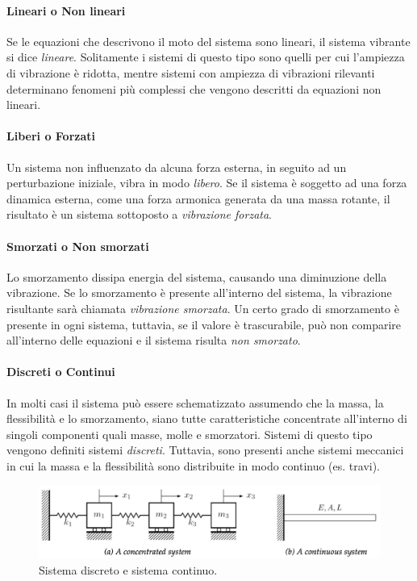 \paragraph{Lineari o Non lineari} Se le equazioni che descrivono il moto del sistema sono lineari, il sistema vibrante si dice \textit{lineare}. Solitamente i sistemi di questo tipo sono quelli per cui l'ampiezza di vibrazione è ridotta, mentre sistemi con ampiezza di vibrazioni rilevanti determinano fenomeni più complessi che vengono descritti da equazioni non lineari. 
\paragraph{Liberi o Forzati} Un sistema non influenzato da alcuna forza esterna, in seguito ad un perturbazione iniziale, vibra in modo \textit{libero}. Se il sistema è soggetto ad una forza dinamica esterna, come una forza armonica generata da una massa rotante, il risultato è un sistema sottoposto a \textit{vibrazione forzata}.
\paragraph{Smorzati o Non smorzati} Lo smorzamento dissipa energia del sistema, causando una diminuzione della vibrazione. Se lo smorzamento è presente all'interno del sistema, la vibrazione risultante sarà chiamata \textit{vibrazione smorzata}. Un certo grado di smorzamento è presente in ogni sistema, tuttavia, se il valore è trascurabile, può non comparire all'interno delle equazioni e il sistema risulta \textit{non smorzato}.
\paragraph{Discreti o Continui} In molti casi il sistema può essere schematizzato assumendo che la massa, la flessibilità e lo smorzamento, siano tutte caratteristiche concentrate all'interno di singoli componenti quali masse, molle e smorzatori. Sistemi di questo tipo vengono definiti sistemi \textit{discreti}. Tuttavia, sono presenti anche sistemi meccanici in cui la massa e la flessibilità sono distribuite in modo continuo (es. travi).
\begin{figure}[h]
    \centering
    \includegraphics[scale=0.5]{DiscretoContinuo.png}
    \caption{Sistema discreto e sistema continuo.}
    \label{DiscretoContinuo}
\end{figure}

